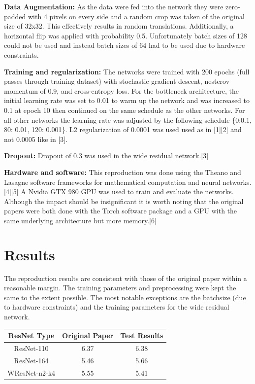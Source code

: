 \documentclass[10pt,a4paper,onecolumn]{article}
\begin{document}
\textbf{Data Augmentation:} As the data were fed into the network they
were zero-padded with 4 pixels on every side and a random crop was taken
of the original size of 32x32. This effectively results in random
translations. Additionally, a horizontal flip was applied with
probability 0.5. Unfortunately batch sizes of 128 could not be used and
instead batch sizes of 64 had to be used due to hardware constraints.

\textbf{Training and regularization:} The networks were trained with 200
epochs (full passes through training dataset) with stochastic gradient
descent, nesterov momentum of 0.9, and cross-entropy loss. For the
bottleneck architecture, the initial learning rate was set to 0.01 to
warm up the network and was increased to 0.1 at epoch 10 then continued
on the same schedule as the other networks. For all other networks the
learning rate was adjusted by the following schedule \{0:0.1, 80: 0.01,
120: 0.001\}. L2 regularization of 0.0001 was used used as in
{[}1{]}{[}2{]} and not 0.0005 like in {[}3{]}.

\textbf{Dropout:} Dropout of 0.3 was used in the wide residual
network.{[}3{]}

\textbf{Hardware and software:} This reproduction was done using the
Theano and Lasagne software frameworks for mathematical computation and
neural networks.{[}4{]}{[}5{]} A Nvidia GTX 980 GPU was used to train
and evaluate the networks. Although the impact should be insignificant
it is worth noting that the original papers were both done with the
Torch software package and a GPU with the same underlying architecture
but more memory.{[}6{]}

\section{Results}\label{results}

The reproduction results are consistent with those of the original paper
within a reasonable margin. The training parameters and preprocessing
were kept the same to the extent possible. The most notable exceptions
are the batchsize (due to hardware constraints) and the training
parameters for the wide residual network.

\begin{longtable}[c]{@{}ccc@{}}
\toprule
\textbf{ResNet Type} & \textbf{Original Paper} & \textbf{Test
Results}\tabularnewline
\midrule
\endhead
ResNet-110 & 6.37 & 6.38\tabularnewline
ResNet-164 & 5.46 & 5.66\tabularnewline
WResNet-n2-k4 & 5.55 & 5.41\tabularnewline
\bottomrule
\end{longtable}
\end{document}
